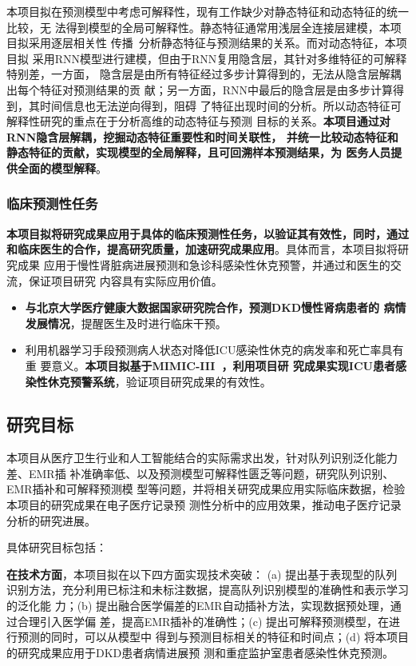 本项目拟在预测模型中考虑可解释性，现有工作缺少对静态特征和动态特征的统一比较，无
法得到模型的全局可解释性。静态特征通常用浅层全连接层建模，本项目拟采用逐层相关性
传播~分析静态特征与预测结果的关系。而对动态特征，本项目拟
采用RNN模型进行建模，但由于RNN复用隐含层，其针对多维特征的可解释特别差，一方面，
隐含层是由所有特征经过多步计算得到的，无法从隐含层解耦出每个特征对预测结果的贡
献；另一方面，RNN中最后的隐含层是由多步计算得到，其时间信息也无法逆向得到，阻碍
了特征出现时间的分析。所以动态特征可解释性研究的重点在于分析高维的动态特征与预测
目标的关系。\textbf{本项目通过对RNN隐含层解耦，挖掘动态特征重要性和时间关联性，
并统一比较动态特征和静态特征的贡献，实现模型的全局解释，且可回溯样本预测结果，为
医务人员提供全面的模型解释}。

\subsubsection{临床预测性任务}

\textbf{本项目拟将研究成果应用于具体的临床预测性任务，以验证其有效性，同时，通过
和临床医生的合作，提高研究质量，加速研究成果应用}。具体而言，本项目拟将研究成果
应用于慢性肾脏病进展预测和急诊科感染性休克预警，并通过和医生的交流，保证项目研究
内容具有实际应用价值。

\begin{itemize}
    \item  \textbf{与北京大学医疗健康大数据国家研究院合作，预测DKD慢性肾病患者的
    病情发展情况}，提醒医生及时进行临床干预。
    \item  利用机器学习手段预测病人状态对降低ICU感染性休克的病发率和死亡率具有重
    要意义。\textbf{本项目拟基于MIMIC-III~，利用项目研
    究成果实现ICU患者感染性休克预警系统}，验证项目研究成果的有效性。
\end{itemize}


\subsection{研究目标}\label{ch2target}

本项目从医疗卫生行业和人工智能结合的实际需求出发，针对队列识别泛化能力差、EMR插
补准确率低、以及预测模型可解释性匮乏等问题，研究队列识别、EMR插补和可解释预测模
型等问题，并将相关研究成果应用实际临床数据，检验本项目的研究成果在电子医疗记录预
测性分析中的应用效果，推动电子医疗记录分析的研究进展。

具体研究目标包括：

\textbf{在技术方面}，本项目拟在以下四方面实现技术突破： (a) 提出基于表现型的队列
识别方法，充分利用已标注和未标注数据，提高队列识别模型的准确性和表示学习的泛化能
力；(b) 提出融合医学偏差的EMR自动插补方法，实现数据预处理，通过合理引入医学偏
差，提高EMR插补的准确性；(c) 提出可解释预测模型，在进行预测的同时，可以从模型中
得到与预测目标相关的特征和时间点；(d) 将本项目的研究成果应用于DKD患者病情进展预
测和重症监护室患者感染性休克预测。


